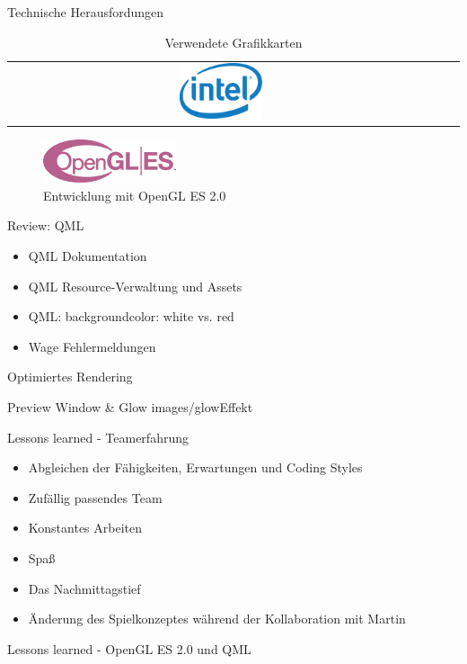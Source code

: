 \begin{frame}{Technische Herausfordungen}
{\begin{table}[h]
\begin{tabular}{c|c|c}
		\includegraphics[width=0.2\textwidth, height=0.1\textheight, keepaspectratio]{images/Intel-logo}  
	\end{tabular}
	\caption{Verwendete Grafikkarten}
	\end{table}
}
\begin{figure}
		\centering
		\includegraphics[width=0.35\textwidth, height=0.7\textheight, keepaspectratio]{images/opengl_es_logo}
		\caption{Entwicklung mit OpenGL ES 2.0}
	\end{figure}
\end{frame}


\begin{frame}{Review: QML}
	\begin{itemize}
	\item QML Dokumentation
	\item QML Resource-Verwaltung und Assets
	\item QML: backgroundcolor: white vs. red
	\item Wage Fehlermeldungen
	\end{itemize}
\end{frame}

\begin{frame}{Optimiertes Rendering}

\end{frame}

\slidegraphic
{Preview Window \& Glow}
{images/glowEffekt}
{}

\begin{frame}{Lessons learned - Teamerfahrung}
	\begin{itemize}
		\item Abgleichen der Fähigkeiten, Erwartungen und Coding Styles
		\item Zufällig passendes Team
		\item Konstantes Arbeiten
		\item Spaß
	\end{itemize}
	\vfill
	\begin{itemize}
		\item Das Nachmittagstief
		\item Änderung des Spielkonzeptes während der Kollaboration mit Martin
	\end{itemize}
\end{frame}

\begin{frame}{Lessons learned - OpenGL ES 2.0 und QML}

\end{frame}

%


